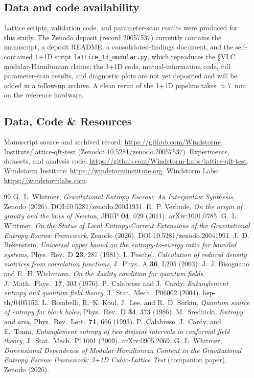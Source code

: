 \documentclass[11pt]{article}
\begin{document}
\subsection*{Data and code availability}
Lattice scripts, validation code, and parameter-scan results were produced for this study. The Zenodo
deposit (record 20057537) currently contains the manuscript, a deposit README, a
consolidated-findings document, and the self-contained 1+1D script \texttt{lattice\_1d\_modular.py},
which reproduces the \S VI.C modular-Hamiltonian claims; the 3+1D code, mutual-information code, full
parameter-scan results, and diagnostic plots are not yet deposited and will be added in a follow-up
archive. A clean rerun of the 1+1D pipeline takes $\approx 7$~min on the reference hardware.

\subsection*{Data, Code \& Resources}
\noindent Manuscript source and archived record: \url{https://github.com/Windstorm-Institute/lattice-qft-test} (Zenodo: \href{https://doi.org/10.5281/zenodo.20057537}{10.5281/zenodo.20057537}). Experiments, datasets, and analysis code: \url{https://github.com/Windstorm-Labs/lattice-qft-test}. Windstorm Institute: \url{https://windstorminstitute.org}. Windstorm Labs: \url{https://windstormlabs.com}.

\begin{thebibliography}{99}\small
{} G.~L. Whitmer, \textit{Gravitational Entropy Escrow: An Interpretive Synthesis},
Zenodo (2026). DOI:10.5281/zenodo.20031931.
 E.~P. Verlinde, \textit{On the origin of gravity and the laws of Newton}, JHEP
\textbf{04}, 029 (2011). arXiv:1001.0785.
 G.~L. Whitmer, \textit{On the Status of Local Entropy-Current Extensions of the
Gravitational Entropy Escrow Framework}, Zenodo (2026). DOI:10.5281/zenodo.20041991.
 J.~D. Bekenstein, \textit{Universal upper bound on the entropy-to-energy ratio for
bounded systems}, Phys.\ Rev.\ D \textbf{23}, 287 (1981).
 I.~Peschel, \textit{Calculation of reduced density matrices from correlation
functions}, J.\ Phys.\ A \textbf{36}, L205 (2003).
 J.~J. Bisognano and E.~H. Wichmann, \textit{On the duality condition for quantum
fields}, J.\ Math.\ Phys.\ \textbf{17}, 303 (1976).
 P.~Calabrese and J.~Cardy, \textit{Entanglement entropy and quantum field theory}, J.\
Stat.\ Mech.\ P06002 (2004). hep-th/0405152.
 L.~Bombelli, R.~K. Koul, J.~Lee, and R.~D. Sorkin, \textit{Quantum source of entropy
for black holes}, Phys.\ Rev.\ D \textbf{34}, 373 (1986).
 M.~Srednicki, \textit{Entropy and area}, Phys.\ Rev.\ Lett.\ \textbf{71}, 666 (1993).
\bibitem{cct} P.~Calabrese, J.~Cardy, and E.~Tonni, \textit{Entanglement entropy of two disjoint
intervals in conformal field theory}, J.\ Stat.\ Mech.\ P11001 (2009). arXiv:0905.2069.
\bibitem{companion} G.~L. Whitmer, \textit{Dimensional Dependence of Modular Hamiltonian Content in
the Gravitational Entropy Escrow Framework: 3+1D Cubic-Lattice Test} (companion paper), Zenodo
(2026).
\end{thebibliography}
\end{document}
